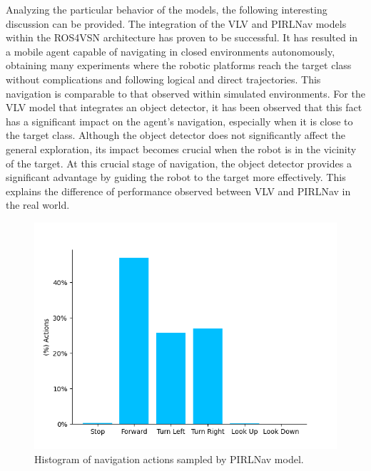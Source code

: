 Analyzing the particular behavior of the models, the following interesting discussion can be provided.
The integration of the VLV and PIRLNav models within the ROS4VSN architecture has proven to be successful.
It has resulted in a mobile agent capable of navigating in closed environments autonomously, obtaining many experiments where the robotic platforms reach the target class without complications and following logical and direct trajectories.
This navigation is comparable to that observed within simulated environments.
For the VLV model that integrates an object detector, it has been observed that this fact has a significant impact on the agent's navigation, especially when it is close to the target class.
Although the object detector does not significantly affect the general exploration, its impact becomes crucial when the robot is in the vicinity of the target.
At this crucial stage of navigation, the object detector provides a significant advantage by guiding the robot to the target more effectively.
This explains the difference of performance observed between VLV and PIRLNav in the real world.

\begin{figure}[t]
    \centering
        \includegraphics[width=\linewidth]{figures/ros4vsn/histograma_PIRLNav}
        \caption{Histogram of navigation actions sampled by PIRLNav model.}
        \label{fig:histrogram_pirlnav}
\end{figure}

